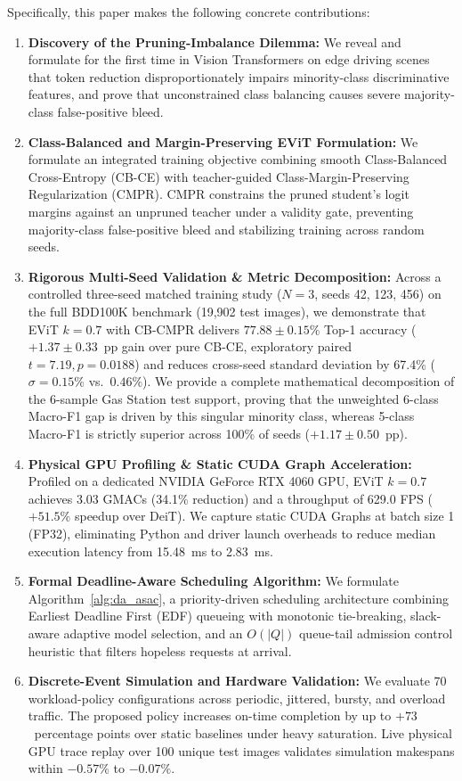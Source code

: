 \documentclass[conference]{IEEEtran}
\begin{document}
Specifically, this paper makes the following concrete contributions:
\begin{enumerate}
    \item \textbf{Discovery of the Pruning-Imbalance Dilemma:} We reveal and formulate for the first time in Vision Transformers on edge driving scenes that token reduction disproportionately impairs minority-class discriminative features, and prove that unconstrained class balancing causes severe majority-class false-positive bleed.
    \item \textbf{Class-Balanced and Margin-Preserving EViT Formulation:} We formulate an integrated training objective combining smooth Class-Balanced Cross-Entropy (CB-CE) with teacher-guided Class-Margin-Preserving Regularization (CMPR). CMPR constrains the pruned student's logit margins against an unpruned teacher under a validity gate, preventing majority-class false-positive bleed and stabilizing training across random seeds.
    \item \textbf{Rigorous Multi-Seed Validation \& Metric Decomposition:} Across a controlled three-seed matched training study ($N=3$, seeds 42, 123, 456) on the full BDD100K benchmark (19,902 test images), we demonstrate that EViT $k=0.7$ with CB-CMPR delivers $77.88 \pm 0.15\%$ Top-1 accuracy ($+1.37 \pm 0.33$~pp gain over pure CB-CE, exploratory paired $t=7.19, p=0.0188$) and reduces cross-seed standard deviation by 67.4\% ($\sigma = 0.15\%$ vs.\ $0.46\%$). We provide a complete mathematical decomposition of the 6-sample Gas Station test support, proving that the unweighted 6-class Macro-F1 gap is driven by this singular minority class, whereas 5-class Macro-F1 is strictly superior across 100\% of seeds ($+1.17 \pm 0.50$~pp).
    \item \textbf{Physical GPU Profiling \& Static CUDA Graph Acceleration:} Profiled on a dedicated NVIDIA GeForce RTX 4060 GPU, EViT $k=0.7$ achieves 3.03 GMACs (34.1\% reduction) and a throughput of 629.0 FPS ($+51.5\%$ speedup over DeiT). We capture static CUDA Graphs at batch size 1 (FP32), eliminating Python and driver launch overheads to reduce median execution latency from 15.48~ms to 2.83~ms.
    \item \textbf{Formal Deadline-Aware Scheduling Algorithm:} We formulate Algorithm~\ref{alg:da_asac}, a priority-driven scheduling architecture combining Earliest Deadline First (EDF) queueing with monotonic tie-breaking, slack-aware adaptive model selection, and an $O(|Q|)$ queue-tail admission control heuristic that filters hopeless requests at arrival.
    \item \textbf{Discrete-Event Simulation and Hardware Validation:} We evaluate 70 workload-policy configurations across periodic, jittered, bursty, and overload traffic. The proposed policy increases on-time completion by up to $+73$~percentage points over static baselines under heavy saturation. Live physical GPU trace replay over 100 unique test images validates simulation makespans within $-0.57\%$ to $-0.07\%$.
\end{enumerate}
\end{document}
